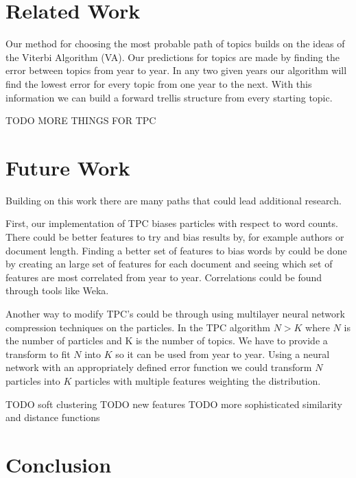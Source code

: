 \documentclass[conference]{IEEEtran}
\begin{document}
\section{Related Work}
Our method for choosing the most probable path of topics builds on the ideas of the Viterbi Algorithm (VA)\cite{viterbi}. Our predictions for topics are made by finding the error between topics from year to year. In any two given years our algorithm will find the lowest error for every topic from one year to the next. With this information we can build a forward trellis structure from every starting topic.

TODO MORE THINGS FOR TPC

\section{Future Work}
Building on this work there are many paths that could lead additional research.

First, our implementation of TPC biases particles with respect to word counts. There could be better features to try and bias results by, for example authors or document length. Finding a better set of features to bias words by could be done by creating an large set of features for each document and seeing which set of features are most correlated from year to year. Correlations could be found through tools like Weka. 

Another way to modify TPC's could be through using multilayer neural network compression techniques on the particles. In the TPC algorithm $N>K$ where $N$ is the number of particles and K is the number of topics. We have to provide a transform to fit $N$ into $K$ so it can be used from year to year. Using a neural network with an appropriately defined error function we could transform $N$ particles into $K$ particles with multiple features weighting the distribution.

TODO soft clustering
TODO new features
TODO more sophisticated similarity and distance functions

\section{Conclusion}
\end{document}

